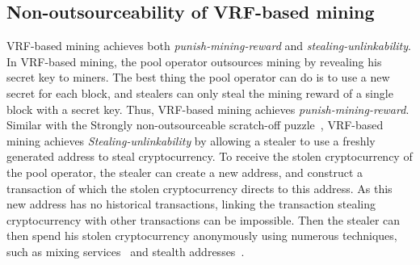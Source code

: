 \subsection{Non-outsourceability of VRF-based mining}

VRF-based mining achieves both \emph{punish-mining-reward} and \emph{stealing-unlinkability}.
In VRF-based mining, the pool operator outsources mining by revealing his secret key to miners.
The best thing the pool operator can do is to use a new secret for each block, and stealers can only steal the mining reward of a single block with a secret key.
Thus, VRF-based mining achieves \emph{punish-mining-reward}.
Similar with the Strongly non-outsourceable scratch-off puzzle~\cite{miller2015nonoutsourceable}, VRF-based mining achieves \emph{Stealing-unlinkability} by allowing a stealer to use a freshly generated address to steal cryptocurrency.
To receive the stolen cryptocurrency of the pool operator, the stealer can create a new address, and construct a transaction of which the stolen cryptocurrency directs to this address.
As this new address has no historical transactions, linking the transaction stealing cryptocurrency with other transactions can be impossible.
Then the stealer can then spend his stolen cryptocurrency anonymously using numerous techniques, such as mixing services~\cite{maxwell2013coinjoin}\cite{bonneau2014mixcoin}\cite{ruffing2014coinshuffle}\cite{heilman2017tumblebit} and stealth addresses~\cite{van2013cryptonote}.


